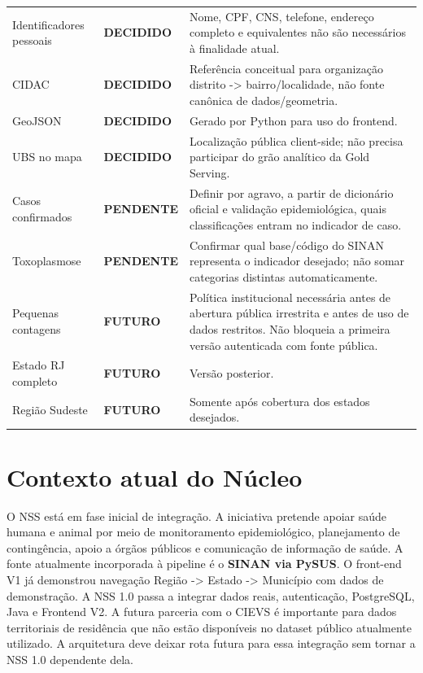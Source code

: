 \documentclass[12pt,a4paper]{article}
\newcommand{\statusDecidido}{\textcolor{decidido}{\textbf{DECIDIDO}}}\newcommand{\statusPendente}{\textcolor{pendente}{\textbf{PENDENTE}}}\newcommand{\statusFuturo}{\textcolor{futuro}{\textbf{FUTURO}}}
\begin{document}
\begin{longtable}{p{4.4cm}p{2.4cm}p{8.2cm}}
Identificadores pessoais & \statusDecidido & Nome, CPF, CNS, telefone, endereço completo e equivalentes não são necessários à finalidade atual. \\
CIDAC & \statusDecidido & Referência conceitual para organização distrito -> bairro/localidade, não fonte canônica de dados/geometria. \\
GeoJSON & \statusDecidido & Gerado por Python para uso do frontend. \\
UBS no mapa & \statusDecidido & Localização pública client-side; não precisa participar do grão analítico da Gold Serving. \\
Casos confirmados & \statusPendente & Definir por agravo, a partir de dicionário oficial e validação epidemiológica, quais classificações entram no indicador de caso. \\
Toxoplasmose & \statusPendente & Confirmar qual base/código do SINAN representa o indicador desejado; não somar categorias distintas automaticamente. \\
Pequenas contagens & \statusFuturo & Política institucional necessária antes de abertura pública irrestrita e antes de uso de dados restritos. Não bloqueia a primeira versão autenticada com fonte pública. \\
Estado RJ completo & \statusFuturo & Versão posterior. \\
Região Sudeste & \statusFuturo & Somente após cobertura dos estados desejados. \\
\bottomrule\end{longtable}
\section{Contexto atual do Núcleo}
O NSS está em fase inicial de integração. A iniciativa pretende apoiar saúde humana e animal por meio de monitoramento epidemiológico, planejamento de contingência, apoio a órgãos públicos e comunicação de informação de saúde.
A fonte atualmente incorporada à pipeline é o \textbf{SINAN via PySUS}. O front-end V1 já demonstrou navegação Região -> Estado -> Município com dados de demonstração. A NSS 1.0 passa a integrar dados reais, autenticação, PostgreSQL, Java e Frontend V2.
A futura parceria com o CIEVS é importante para dados territoriais de residência que não estão disponíveis no dataset público atualmente utilizado. A arquitetura deve deixar rota futura para essa integração sem tornar a NSS 1.0 dependente dela.
\end{document}

